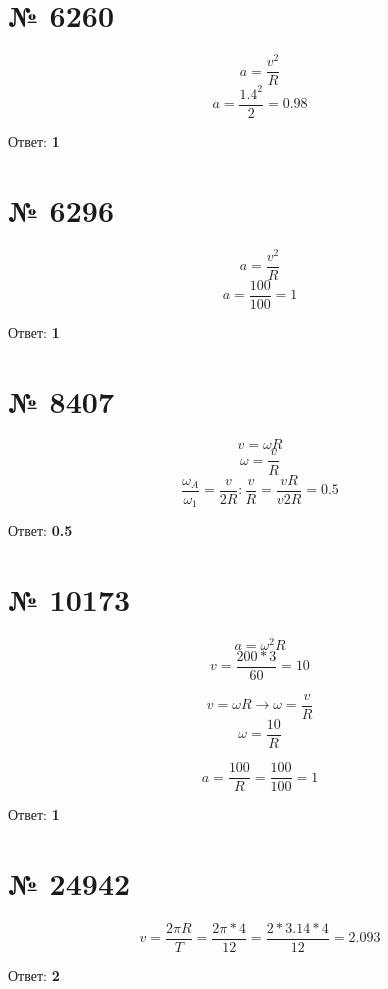 \documentclass[11pt]{article} %
\begin{document}
\section{№ \textbf{6260}}

$$a = \frac{v^2}{R}$$
$$a = \frac{1.4^2}{2} = 0.98$$

Ответ: \textbf{1}

\section{№ \textbf{6296}}

$$a = \frac{v^2}{R}$$
$$a = \frac{100}{100} = 1$$

Ответ: \textbf{1}

\section{№ \textbf{8407}}

$$v = \omega R$$
$$\omega = \frac{v}{R}$$
$$\frac{\omega_A}{\omega_1} = \frac{v}{2R} : \frac{v}{R} = \frac{vR}{v2R} = 0.5$$

Ответ: \textbf{0.5}

\section{№ \textbf{10173}}

$$a = \omega^2 R$$
$$v = \frac{200 * 3}{60} = 10$$

$$v = \omega R \rightarrow \omega = \frac{v}{R}$$
$$\omega = \frac{10}{R}$$

$$a = \frac{100}{R} = \frac{100}{100} = 1$$

Ответ: \textbf{1}

\section{№ \textbf{24942}}

$$v = \frac{2\pi R}{T} = \frac{2\pi * 4}{12} = \frac{2* 3.14 * 4}{12} = 2.093$$

Ответ: \textbf{2}
\end{document}
